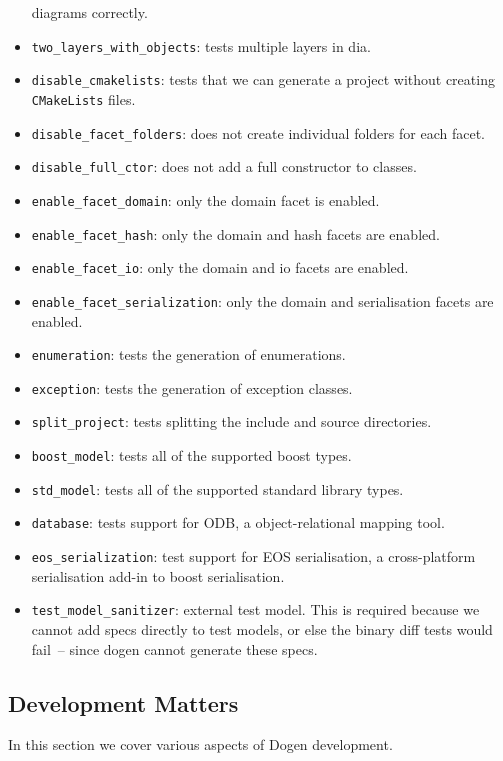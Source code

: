 \documentclass{book}
\begin{document}
\begin{itemize}
  diagrams correctly.
\item \texttt{two\_layers\_with\_objects}: tests multiple layers in
  dia.
\item \texttt{disable\_cmakelists}: tests that we can generate a
  project without creating \texttt{CMakeLists} files.
\item \texttt{disable\_facet\_folders}: does not create individual
  folders for each facet.
\item \texttt{disable\_full\_ctor}: does not add a full constructor to
  classes.
\item \texttt{enable\_facet\_domain}: only the domain facet is
  enabled.
\item \texttt{enable\_facet\_hash}: only the domain and hash facets
  are enabled.
\item \texttt{enable\_facet\_io}: only the domain and io facets are
  enabled.
\item \texttt{enable\_facet\_serialization}: only the domain and
  serialisation facets are enabled.
\item \texttt{enumeration}: tests the generation of enumerations.
\item \texttt{exception}: tests the generation of exception classes.
\item \texttt{split\_project}: tests splitting the include and source
  directories.
\item \texttt{boost\_model}: tests all of the supported boost types.
\item \texttt{std\_model}: tests all of the supported standard library
  types.
\item \texttt{database}: tests support for ODB, a object-relational
  mapping tool.
\item \texttt{eos\_serialization}: test support for EOS serialisation,
  a cross-platform serialisation add-in to boost serialisation.
\item \texttt{test\_model\_sanitizer}: external test model. This is
  required because we cannot add specs directly to test models, or
  else the binary diff tests would fail~-- since dogen cannot generate
  these specs.
\end{itemize}

\subsection{Development Matters}

In this section we cover various aspects of Dogen development.
\end{document}
